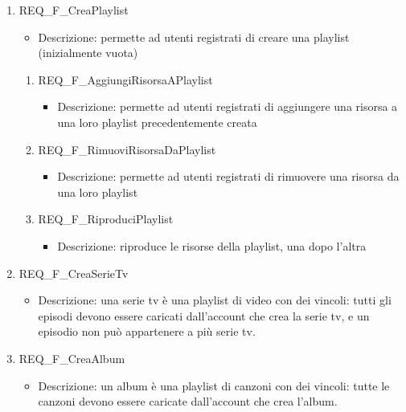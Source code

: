 \begin{enumerate}
	\item REQ\_F\_CreaPlaylist
		\begin{itemize}	
			\item Descrizione: permette ad utenti registrati di creare una playlist (inizialmente vuota)
		\end{itemize}
		\begin{enumerate}[label*=\arabic*.]
		\item REQ\_F\_AggiungiRisorsaAPlaylist
			\begin{itemize}	
				\item Descrizione: permette ad utenti registrati di aggiungere una risorsa a una loro playlist precedentemente creata
			\end{itemize}

		\item REQ\_F\_RimuoviRisorsaDaPlaylist
			\begin{itemize}	
				\item Descrizione: permette ad utenti registrati di rimuovere una risorsa da una loro playlist
			\end{itemize}

		\item REQ\_F\_RiproduciPlaylist
			\begin{itemize}	
				\item Descrizione: riproduce le risorse della playlist, una dopo l'altra
			\end{itemize}
		\end{enumerate}		
	
	\item REQ\_F\_CreaSerieTv
		\begin{itemize}	
			\item Descrizione: una serie tv è una playlist di video con dei vincoli: tutti gli episodi devono essere caricati dall'account che crea la serie tv, e un episodio non può appartenere a più serie tv.
		\end{itemize}

	\item REQ\_F\_CreaAlbum
		\begin{itemize}	
			\item Descrizione: un album è una playlist di canzoni con dei vincoli: tutte le canzoni devono essere caricate dall'account che crea l'album.
		\end{itemize}


\end{enumerate}
